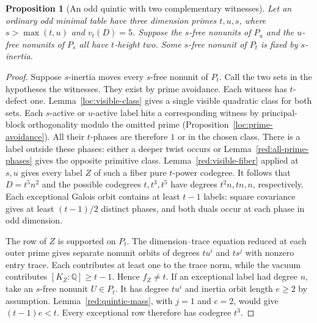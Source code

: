 \documentclass[11pt,a4paper]{article}
\numberwithin{equation}{section}
\newtheorem{proposition}[theorem]{Proposition}
\newcommand{\QQ}{\mathbb Q}
\begin{document}
\begin{proposition}[An odd quintic with two complementary witnesses]\label{red:quintic-fixed-witness}
Let an ordinary odd minimal table have three dimension primes
$t,u,s$, where $s>\max(t,u)$ and $v_t(D)=5$. Suppose the
$s$-free nonunits of $P_u$ and the $u$-free nonunits of $P_s$
all have $t$-height two. Some $s$-free nonunit of $P_t$ is fixed
by $s$-inertia.
\end{proposition}
\begin{proof}
Suppose $s$-inertia moves every $s$-free nonunit of $P_t$. Call the two
sets in the hypotheses the witnesses. They exist by prime avoidance.
Each witness has $t$-defect one. Lemma~\ref{loc:visible-class}
gives a single visible quadratic class for both sets. Each $s$-active or $u$-active label hits
a corresponding witness by principal-block orthogonality modulo
the omitted prime (Proposition~\ref{loc:prime-avoidance}). All their
$t$-phases are therefore $1$ or in the chosen class. There is a
label outside these phases: either a deeper twist occurs or
Lemma~\ref{red:all-prime-phases} gives the opposite primitive class.
Lemma~\ref{red:visible-fiber} applied at $s,u$ gives every label $Z$ of such a fiber pure $t$-power codegree. It follows that $D=t^5n^2$ and the
possible codegrees $t,t^3,t^5$ have degrees $t^2n,tn,n$,
respectively. Each exceptional Galois orbit contains at least
$t-1$ labels: square covariance gives at least $(t-1)/2$
distinct phases, and both duals occur at each phase in odd
dimension.

The row of $Z$ is supported on $P_t$. The dimension--trace
equation reduced at each outer prime gives separate nonunit
orbits of degrees $tu^i$ and $ts^j$ with nonzero entry trace.
Each contributes at least one to the trace norm, while the vacuum
contributes $[K_Z:\QQ]\ge t-1$. Hence $f_Z\ne t$.
If an exceptional label had degree $n$, take an $s$-free nonunit
$U\in P_t$. It has degree $tu^i$ and inertia orbit length $e\ge2$
by assumption. Lemma~\ref{red:quintic-mass}, with $j=1$ and $c=2$, would give $(t-1)e<t$. Every exceptional row therefore has
codegree $t^3$.


\end{proof}
\end{document}
